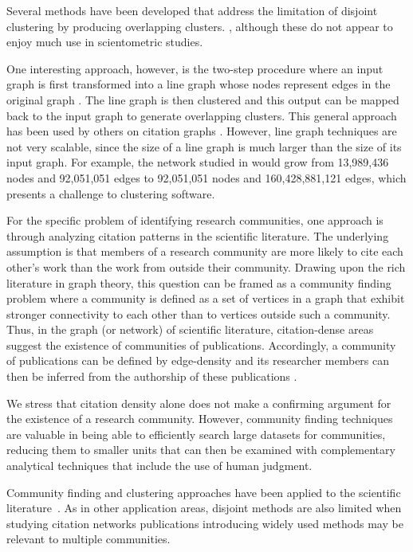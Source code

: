 \documentclass[12pt, oneside]{article}   	%
\begin{document}
Several methods have been developed that address the limitation of disjoint clustering by producing overlapping clusters. \citep{Baumes2005,Palla2005,banerjee2005model,Cleuziou2008,Lancichinetti2009,Lu2012,yang2013overlapping}, although these do not appear to enjoy much use in scientometric studies. 

One interesting approach, however, is the two-step procedure where an input graph is first transformed into a line graph whose nodes represent edges in the original graph \citep{Harary1960}.  The line graph is then clustered and this output can be mapped back to the input graph to generate overlapping clusters. This general approach has been used by others on citation graphs \citep{Evans2009,Havemann2018,Havemann2021}. However, line graph  techniques are not very scalable, since the size of a line graph is much larger than the size of its input graph. For example, the network studied in \cite{Wedell2022} would grow from 13,989,436 nodes and 92,051,051 edges to 92,051,051 nodes and 160,428,881,121 edges, which presents a challenge to clustering software. 
 
For the specific problem of identifying research communities, one approach is through analyzing citation patterns in the scientific literature. The underlying assumption is that members of a research community are more likely to cite each other's work than the work from outside their community. Drawing upon the rich literature in graph theory, this question can be framed as a community finding problem where a community is defined as a set of vertices in a graph that exhibit stronger connectivity to each other than to vertices outside such a community. Thus, in the graph (or network) of scientific literature, citation-dense areas suggest the existence of communities of publications. Accordingly, a community of publications can be defined by edge-density and its researcher members can then be inferred from the authorship of these publications \citep{Chandrasekharan2021,Wedell2022}. 

We stress that citation density alone does not make a confirming argument for the existence of a research community. However, community finding techniques are valuable in being able to efficiently search large datasets for communities, reducing them to smaller units that can then be examined with complementary analytical techniques that include the use of human judgment. 

Community finding and clustering approaches have been applied to the scientific literature~\citep{Newman2006,Fortunato2009,Boyack2010,Boyack2019,Traag2019,Ahlgren2020,Chandrasekharan2021,Wedell2022}. As in other application areas, disjoint methods are also limited when studying citation networks  publications introducing widely used methods may be relevant to multiple communities.
	
\end{document}
